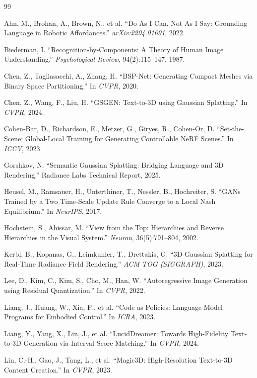\documentclass[11pt]{article}
\begin{document}
\begin{thebibliography}{99}

 Ahn, M., Brohan, A., Brown, N., et al. ``Do As I Can, Not As I Say: Grounding Language in Robotic Affordances.'' \textit{arXiv:2204.01691}, 2022.

 Biederman, I. ``Recognition-by-Components: A Theory of Human Image Understanding.'' \textit{Psychological Review}, 94(2):115--147, 1987.

 Chen, Z., Tagliasacchi, A., Zhang, H. ``BSP-Net: Generating Compact Meshes via Binary Space Partitioning.'' In \textit{CVPR}, 2020.

 Chen, Z., Wang, F., Liu, H. ``GSGEN: Text-to-3D using Gaussian Splatting.'' In \textit{CVPR}, 2024.

 Cohen-Bar, D., Richardson, E., Metzer, G., Giryes, R., Cohen-Or, D. ``Set-the-Scene: Global-Local Training for Generating Controllable NeRF Scenes.'' In \textit{ICCV}, 2023.

 Gorshkov, N. ``Semantic Gaussian Splatting: Bridging Language and 3D Rendering.'' Radiance Labs Technical Report, 2025.

 Heusel, M., Ramsauer, H., Unterthiner, T., Nessler, B., Hochreiter, S. ``GANs Trained by a Two Time-Scale Update Rule Converge to a Local Nash Equilibrium.'' In \textit{NeurIPS}, 2017.

 Hochstein, S., Ahissar, M. ``View from the Top: Hierarchies and Reverse Hierarchies in the Visual System.'' \textit{Neuron}, 36(5):791--804, 2002.

 Kerbl, B., Kopanas, G., Leimkuhler, T., Drettakis, G. ``3D Gaussian Splatting for Real-Time Radiance Field Rendering.'' \textit{ACM TOG (SIGGRAPH)}, 2023.

 Lee, D., Kim, C., Kim, S., Cho, M., Han, W. ``Autoregressive Image Generation using Residual Quantization.'' In \textit{CVPR}, 2022.

 Liang, J., Huang, W., Xia, F., et al. ``Code as Policies: Language Model Programs for Embodied Control.'' In \textit{ICRA}, 2023.

 Liang, Y., Yang, X., Lin, J., et al. ``LucidDreamer: Towards High-Fidelity Text-to-3D Generation via Interval Score Matching.'' In \textit{CVPR}, 2024.

 Lin, C.-H., Gao, J., Tang, L., et al. ``Magic3D: High-Resolution Text-to-3D Content Creation.'' In \textit{CVPR}, 2023.


\end{thebibliography}
\end{document}
